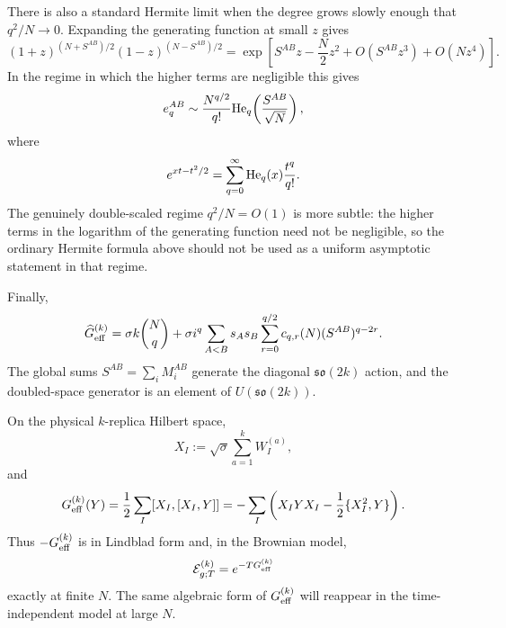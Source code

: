 \documentclass{article}
\theoremstyle{definition}
\begin{document}
There is also a standard Hermite limit when the degree grows slowly enough
that $q^2/N\to0$.  Expanding the generating function at small $z$ gives
\begin{equation}
    (1+z)^{(N+S^{AB})/2}
    (1-z)^{(N-S^{AB})/2}
    =\exp\!\left[
       S^{AB}z-\frac N2z^2
       +O(S^{AB}z^3)+O(Nz^4)
    \right].
\end{equation}
In the regime in which the higher terms are negligible this gives
\begin{equation}
    e_q^{AB}
    \sim\frac{N^{q/2}}{q!}
    {\rm He}_q\!\left(\frac{S^{AB}}{\sqrt N}\right),
\end{equation}
where
\begin{equation}
    e^{xt-t^2/2}
    =\sum_{q=0}^{\infty}{\rm He}_q(x)\frac{t^q}{q!}.
\end{equation}
The genuinely double-scaled regime $q^2/N=O(1)$ is more subtle: the
higher terms in the logarithm of the generating function need not be
negligible, so the ordinary Hermite formula above should not be used as a
uniform asymptotic statement in that regime.

Finally,
\begin{equation}
    \widehat G_{\rm eff}^{(k)}
    =\sigma k\binom Nq
     +\sigma i^q\sum_{A<B}s_As_B
      \sum_{r=0}^{q/2}c_{q,r}(N)(S^{AB})^{q-2r}.
\end{equation}
The global sums $S^{AB}=\sum_iM_i^{AB}$ generate the diagonal
$\mathfrak{so}(2k)$ action, and the doubled-space generator is an element
of $U(\mathfrak{so}(2k))$.

On the physical $k$-replica Hilbert space,
\begin{equation}
    X_I:=\sqrt\sigma\sum_{a=1}^kW_I^{(a)},
\end{equation}
and
\begin{equation}
    G_{\rm eff}^{(k)}(Y)
    =\frac12\sum_I[X_I,[X_I,Y]]
    =-\sum_I\left(X_IYX_I-\frac12\{X_I^2,Y\}\right).
\end{equation}
Thus $-G_{\rm eff}^{(k)}$ is in Lindblad form and, in the Brownian model,
\begin{equation}
    {\cal E}_{g;T}^{(k)}=e^{-T G_{\rm eff}^{(k)}}
\end{equation}
exactly at finite $N$.  The same algebraic form of $G_{\rm eff}^{(k)}$
will reappear in the time-independent model at large $N$.



\end{document}
